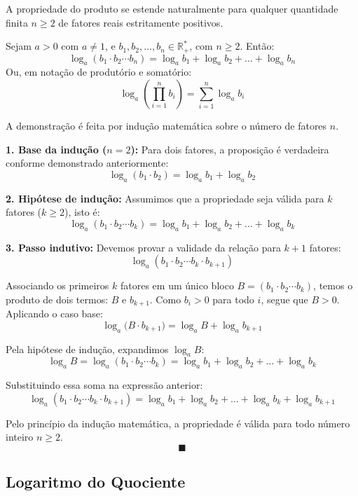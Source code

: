 \documentclass[12pt,a4paper]{report}
\begin{document}
	A propriedade do produto se estende naturalmente para qualquer quantidade finita $n \geqslant 2$ de fatores reais estritamente positivos.
	
	\newpage
	
	\begin{destaque}
		Sejam $a > 0$ com $a \neq 1$, e $b_1, b_2, \dots, b_n \in \mathbb{R}^*_+$, com $n \geqslant 2$. Então:
		$$\log_a (b_1 \cdot b_2 \dotsm b_n) = \log_a b_1 + \log_a b_2 + \dots + \log_a b_n$$
		Ou, em notação de produtório e somatório:
		$$\log_a \left(\prod_{i=1}^n b_i\right) = \sum_{i=1}^n \log_a b_i$$
	\end{destaque}
	
	\begin{destaque}
		A demonstração é feita por indução matemática sobre o número de fatores $n$.
		
		\textbf{1. Base da indução ($n = 2$):}  
		Para dois fatores, a proposição é verdadeira conforme demonstrado anteriormente:
		$$\log_a (b_1 \cdot b_2) = \log_a b_1 + \log_a b_2$$
		
		\textbf{2. Hipótese de indução:}  
		Assumimos que a propriedade seja válida para $k$ fatores ($k \geqslant 2$), isto é:
		$$\log_a (b_1 \cdot b_2 \dotsm b_k) = \log_a b_1 + \log_a b_2 + \dots + \log_a b_k$$
		
		\textbf{3. Passo indutivo:}  
		Devemos provar a validade da relação para $k + 1$ fatores:
		$$\log_a (b_1 \cdot b_2 \dotsm b_k \cdot b_{k+1})$$
		
		Associando os primeiros $k$ fatores em um único bloco $B = (b_1 \cdot b_2 \dotsm b_k)$, temos o produto de dois termos: $B$ e $b_{k+1}$. Como $b_i > 0$ para todo $i$, segue que $B > 0$. Aplicando o caso base:
		$$\log_a \bigl(B \cdot b_{k+1}\bigr) = \log_a B + \log_a b_{k+1}$$
		
		Pela hipótese de indução, expandimos $\log_a B$:
		$$\log_a B = \log_a (b_1 \cdot b_2 \dotsm b_k) = \log_a b_1 + \log_a b_2 + \dots + \log_a b_k$$
		
		Substituindo essa soma na expressão anterior:
		$$\log_a (b_1 \cdot b_2 \dotsm b_k \cdot b_{k+1}) = \log_a b_1 + \log_a b_2 + \dots + \log_a b_k + \log_a b_{k+1}$$
		
		Pelo princípio da indução matemática, a propriedade é válida para todo número inteiro $n \geqslant 2$.
		$$\blacksquare$$
	\end{destaque}
	
	\subsection{Logaritmo do Quociente}
	
\end{document}
